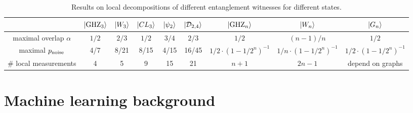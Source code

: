 \begin{table}[!ht]
\centering
\begin{tabular}{c|c|c|c|c|c|c|c|c}
	 & $\ket{\text{GHZ}_3}$ & $\ket{W_3}$ & $\ket{CL_3}$ & $\ket{\psi_2}$ & $\ket{\mathcal{D}_{2,4}}$ & $\ket{\text{GHZ}_n}$ & $\ket{W_n}$ & $\ket{G_n}$ \\
	\hline
	maximal overlap $\alpha$ & $1/2$ & $2/3$ & $1/2$ & $3/4$ & $2/3$ & $1/2$ & $(n-1)/n$ & $1/2$ \\
	maximal $p_{\text{noise}}$ & 4/7 & 8/21 & 8/15 & 4/15 & 16/45 & $1/2 \cdot (1-1/2^n)^{-1}$ & $1/n \cdot (1-1/2^n)^{-1}$ & $1/2 \cdot (1-1/2^n)^{-1}$ \\
	\# local measurements & 4 & 5 & 9 & 15 & 21 & $n+1$ & $2n-1$ & depend on graphs \\
	\hline
\end{tabular}
\caption{Results on local decompositions of different entanglement witnesses for different states. \cite{guhneEntanglementDetection2009}}
\end{table}

\section{Machine learning background}


